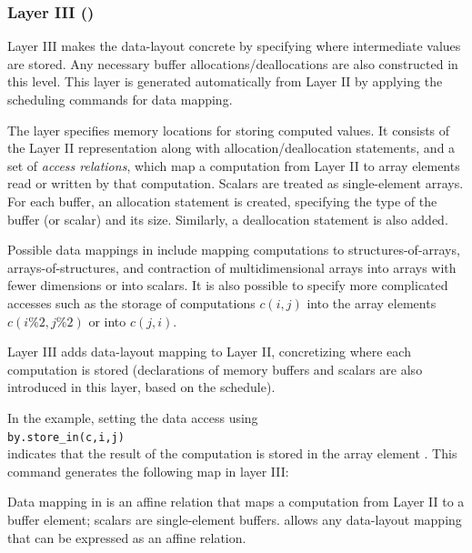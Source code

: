 \subsubsection{Layer III (\Layerthree)}
\label{layer3}

Layer III makes the data-layout concrete by specifying where intermediate values are stored.  Any necessary buffer allocations/deallocations are also constructed in this level.  This layer is generated automatically from Layer II by applying the scheduling commands for data mapping.

The \layerthree layer specifies memory locations for storing computed values.  It consists of the Layer II representation along with allocation/deallocation statements, and a set of \emph{access relations},
which map a computation from Layer II to array elements read or written by that computation.  Scalars are treated as single-element arrays.  %
For each buffer, an allocation statement is created, specifying the type of the buffer (or scalar) and its size.  Similarly, a deallocation statement is also added.

Possible data mappings in \framework include mapping computations to structures-of-arrays, arrays-of-structures, and contraction of multidimensional arrays into arrays with fewer dimensions or into scalars.  It is also possible to specify more complicated accesses such as the storage of computations $c(i,j)$ into the array elements $c(i\%2,j\%2)$ or into $c(j,i)$.

Layer III adds data-layout mapping to Layer II, concretizing where each computation is stored (declarations of memory buffers and scalars are also introduced in this layer, based on the schedule).

In the example, setting the data access using\\ \texttt{by.store\_in({c,i,j})}\\
indicates that the result of the computation  is stored in the array element . This command generates the following map in layer III:

\noindent
{}

Data mapping in \framework is an affine relation that maps a computation from Layer II to a buffer element; scalars are single-element buffers.  \framework allows any data-layout mapping that can be expressed as an affine relation.

